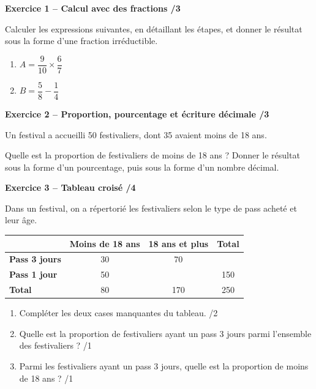 \documentclass[10pt,a4paper]{article}
\begin{document}
\newpage



\textbf{Exercice 1 -- Calcul avec des fractions \hfill /3}

Calculer les expressions suivantes, en détaillant les étapes, et donner le résultat sous la forme d'une fraction irréductible.

\begin{enumerate}
\item \(A = \dfrac{9}{10}\times\dfrac{6}{7}\)

\vspace{2.5cm}

\item \(B = \dfrac{5}{8}-\dfrac{1}{4}\)

\vspace{2.5cm}
\end{enumerate}

\textbf{Exercice 2 -- Proportion, pourcentage et écriture décimale \hfill /3}

Un festival a accueilli 50 festivaliers, dont 35 avaient moins de 18 ans.

Quelle est la proportion de festivaliers de moins de 18 ans ? Donner le résultat sous la forme d'un pourcentage, puis sous la forme d'un nombre décimal.

\vspace{3cm}

\textbf{Exercice 3 -- Tableau croisé \hfill /4}

Dans un festival, on a répertorié les festivaliers selon le type de pass acheté et leur âge.

\begin{center}
\renewcommand{\arraystretch}{1.5}
\begin{tabular}{|l|c|c|c|}
\hline
 & \textbf{Moins de 18 ans} & \textbf{18 ans et plus} & \textbf{Total} \\
\hline
\textbf{Pass 3 jours} & 30 & 70 & \\
\hline
\textbf{Pass 1 jour} & 50 & & 150 \\
\hline
\textbf{Total} & 80 & 170 & 250 \\
\hline
\end{tabular}
\end{center}

\begin{enumerate}
\item Compléter les deux cases manquantes du tableau. \hfill /2

\vspace{1.5cm}

\item Quelle est la proportion de festivaliers ayant un pass 3 jours parmi l'ensemble des festivaliers ? \hfill /1

\vspace{1.5cm}

\item Parmi les festivaliers ayant un pass 3 jours, quelle est la proportion de moins de 18 ans ? \hfill /1
\end{enumerate}
\end{document}
